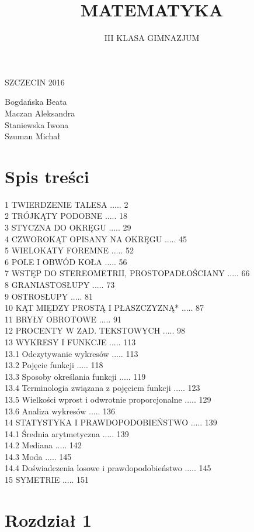 \documentclass[10pt]{article}
\title{MATEMATYKA }
\author{III KLASA GIMNAZJUM}
\date{}
\begin{document}
\maketitle
SZCZECIN 2016

Bogdańska Beata\\
Maczan Aleksandra\\
Staniewska Iwona\\
Szuman Michał

\section*{Spis treści}
1 TWIERDZENIE TALESA ..... 2\\
2 TRÓJKĄTY PODOBNE ..... 18\\
3 STYCZNA DO OKRĘGU ..... 29\\
4 CZWOROKĄT OPISANY NA OKRĘGU ..... 45\\
5 WIELOKATY FOREMNE ..... 52\\
6 POLE I OBWÓD KOŁA ..... 56\\
7 WSTĘP DO STEREOMETRII, PROSTOPADŁOŚCIANY ..... 66\\
8 GRANIASTOSŁUPY ..... 73\\
9 OSTROSŁUPY ..... 81\\
10 KĄT MIĘDZY PROSTĄ I PŁASZCZYZNĄ* ..... 87\\
11 BRYŁY OBROTOWE ..... 91\\
12 PROCENTY W ZAD. TEKSTOWYCH ..... 98\\
13 WYKRESY I FUNKCJE ..... 113\\
13.1 Odczytywanie wykresów ..... 113\\
13.2 Pojęcie funkcji ..... 118\\
13.3 Sposoby określania funkcji ..... 119\\
13.4 Terminologia związana z pojęciem funkcji ..... 123\\
13.5 Wielkości wprost i odwrotnie proporcjonalne ..... 129\\
13.6 Analiza wykresów ..... 136\\
14 STATYSTYKA I PRAWDOPODOBIEŃSTWO ..... 139\\
14.1 Średnia arytmetyczna ..... 139\\
14.2 Mediana ..... 142\\
14.3 Moda ..... 145\\
14.4 Doświadczenia losowe i prawdopodobieństwo ..... 145\\
15 SYMETRIE ..... 151

\section*{Rozdział 1}
\end{document}
